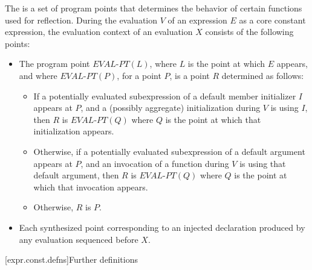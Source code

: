 \pnum
The  is a set of program points
that determines the behavior of certain functions
used for reflection.
During the evaluation $V$ of an expression $E$ as a core constant expression,
the evaluation context of an evaluation $X$
consists of the following points:
\begin{itemize}
\item
The program point $\textit{EVAL-PT}(L)$,
where $L$ is the point at which $E$ appears, and
where $\textit{EVAL-PT}(P)$, for a point $P$,
is a point $R$ determined as follows:
\begin{itemize}
\item
If a potentially evaluated subexpression of
a default member initializer $I$ appears at $P$, and
a (possibly aggregate) initialization during $V$ is using $I$,
then $R$ is $\textit{EVAL-PT}(Q)$
where $Q$ is the point at which that initialization appears.
\item
Otherwise, if a potentially evaluated subexpression of
a default argument appears at $P$, and
an invocation of a function during $V$
is using that default argument,
then $R$ is $\textit{EVAL-PT}(Q)$
where $Q$ is the point at which that invocation appears.
\item
Otherwise, $R$ is $P$.
\end{itemize}
\item
Each synthesized point corresponding to an injected declaration produced by
any evaluation sequenced before $X$.
\end{itemize}

[expr.const.defns]{Further definitions}

